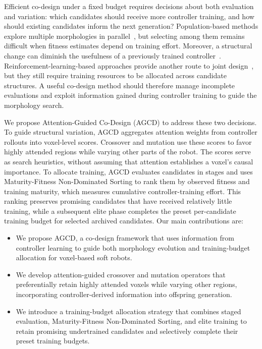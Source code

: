 \documentclass{article}
\begin{document}
    Efficient co-design under a fixed budget requires decisions about both
    evaluation and variation: which candidates should receive more controller
    training, and how should existing candidates inform the next generation?
    Population-based methods explore multiple morphologies in parallel~\cite{stanley2009hypercube,tanaka2022co,harada2024lamarckian},
    but selecting among them remains difficult when fitness estimates depend on
    training effort. Moreover, a structural change can diminish the usefulness
    of a previously trained controller~\cite{cheney2018scalable}.
    Reinforcement-learning-based approaches provide another route to joint
    design~\cite{wang2023curriculum,wang2019neural,lu2025bodygen,xu2021end}, but
    they still require training resources to be allocated across candidate
    structures. A useful co-design method should therefore manage incomplete
    evaluations and exploit information gained during controller training to
    guide the morphology search.

    We propose Attention-Guided Co-Design (AGCD) to address these two decisions.
    To guide structural variation, AGCD aggregates attention weights from
    controller rollouts into voxel-level scores. Crossover and mutation use
    these scores to favor highly attended regions while varying other parts of
    the robot. The scores serve as search heuristics, without assuming that
    attention establishes a voxel's causal importance. To allocate training,
    AGCD evaluates candidates in stages and uses Maturity-Fitness Non-Dominated
    Sorting to rank them by observed fitness and training maturity, which
    measures cumulative controller-training effort. This ranking preserves
    promising candidates that have received relatively little training, while
    a subsequent elite phase completes the preset per-candidate training budget
    for selected archived candidates. Our main contributions are:
    \begin{itemize}
        \item We propose AGCD, a co-design framework that uses information from
            controller learning to guide both morphology evolution and
            training-budget allocation for voxel-based soft robots.
        \item We develop attention-guided crossover and mutation operators that
            preferentially retain highly attended voxels while varying other
            regions, incorporating controller-derived information into offspring
            generation.
        \item We introduce a training-budget allocation strategy that combines
            staged evaluation, Maturity-Fitness Non-Dominated Sorting, and elite
            training to retain promising undertrained candidates and selectively
            complete their preset training budgets.
    \end{itemize}
\end{document}
